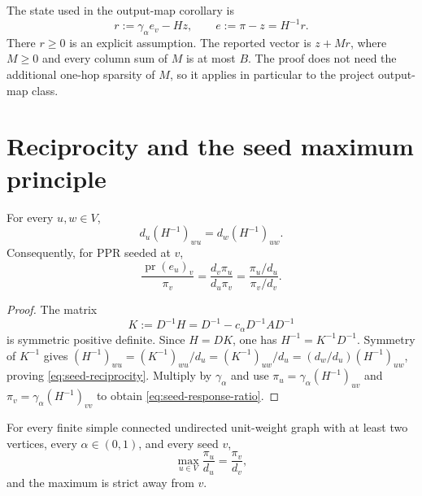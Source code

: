 \documentclass[11pt]{article}
\begin{document}
The state used in the output-map corollary is
\begin{equation}
 r:=\gamma_{\alpha} e_v-Hz,
 \qquad e:=\pi-z=H^{-1}r.
 \label{eq:seed-state}
\end{equation}
There $r\ge0$ is an explicit assumption.  The reported vector is $z+Mr$,
where $M\ge0$ and every column sum of $M$ is at most $B$.  The proof does not
need the additional one-hop sparsity of $M$, so it applies in particular to
the project output-map class.

\section{Reciprocity and the seed maximum principle}
\label{sec:seed-maximum}

\begin{lemma}
\label{lem:seed-reciprocity}
For every $u,w\in V$,
\begin{equation}
 d_u(H^{-1})_{wu}=d_w(H^{-1})_{uw}.
 \label{eq:seed-reciprocity}
\end{equation}
Consequently, for PPR seeded at $v$,
\begin{equation}
 \frac{\operatorname{pr}(e_u)_v}{\pi_v}
 =\frac{d_v\pi_u}{d_u\pi_v}
 =\frac{\pi_u/d_u}{\pi_v/d_v}.
 \label{eq:seed-response-ratio}
\end{equation}
\end{lemma}

\begin{proof}
The matrix
\[
 K:=D^{-1}H=D^{-1}-c_{\alpha} D^{-1}AD^{-1}
\]
is symmetric positive definite.  Since $H=DK$, one has
$H^{-1}=K^{-1}D^{-1}$.  Symmetry of $K^{-1}$ gives
$(H^{-1})_{wu}=(K^{-1})_{wu}/d_u
=(K^{-1})_{uw}/d_u=(d_w/d_u)(H^{-1})_{uw}$, proving
\eqref{eq:seed-reciprocity}.  Multiply by $\gamma_{\alpha}$ and use
$\pi_u=\gamma_{\alpha}(H^{-1})_{uv}$ and
$\pi_v=\gamma_{\alpha}(H^{-1})_{vv}$ to obtain
\eqref{eq:seed-response-ratio}.
\end{proof}

\begin{theorem}
\label{thm:seed-normalized-maximum}
For every finite simple connected undirected unit-weight graph with at least
two vertices, every $\alpha\in(0,1)$, and every seed $v$,
\begin{equation}
 \max_{u\in V}\frac{\pi_u}{d_u}=\frac{\pi_v}{d_v},
 \label{eq:seed-normalized-maximum}
\end{equation}
and the maximum is strict away from $v$.
\end{theorem}
\end{document}
